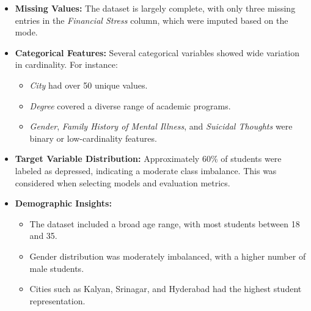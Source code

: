 \documentclass{article} %
\begin{document}
\begin{itemize}
    \item \textbf{Missing Values:} The dataset is largely complete, with only three missing entries in the \textit{Financial Stress} column, which were imputed based on the mode.
    
    \item \textbf{Categorical Features:} Several categorical variables showed wide variation in cardinality. For instance:
    \begin{itemize}
        \item \textit{City} had over 50 unique values.
        \item \textit{Degree} covered a diverse range of academic programs.
        \item \textit{Gender}, \textit{Family History of Mental Illness}, and \textit{Suicidal Thoughts} were binary or low-cardinality features.
    \end{itemize}
    
    \item \textbf{Target Variable Distribution:} Approximately 60\% of students were labeled as depressed, indicating a moderate class imbalance. This was considered when selecting models and evaluation metrics.

    \item \textbf{Demographic Insights:}
    \begin{itemize}
        \item The dataset included a broad age range, with most students between 18 and 35.
        \item Gender distribution was moderately imbalanced, with a higher number of male students.
        \item Cities such as Kalyan, Srinagar, and Hyderabad had the highest student representation.
    \end{itemize}


\end{itemize}
\end{document}

